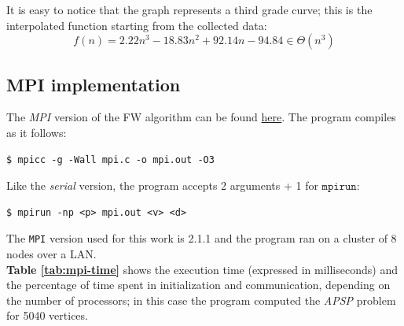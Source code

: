 It is easy to notice that the graph represents a 
third grade curve; this is the interpolated function starting from the collected data:
\[f(n) = 2.22n^3 - 18.83n^2 + 92.14n -94.84 \in \Theta(n^3) \]



\subsection{MPI implementation}\label{mpiimpl}

The \emph{MPI} version of the FW algorithm can be found \href{https://github.com/firaja/Parallel-FloydWarshall/blob/master/mpi.c}{here}. 
The program compiles as it follows:

\begin{lstlisting}[basicstyle=\footnotesize\ttfamily]
$ mpicc -g -Wall mpi.c -o mpi.out -O3
\end{lstlisting}
Like the \emph{serial} version, the program accepts 2 arguments + 1 for $\texttt{mpirun}$:
\begin{lstlisting}[basicstyle=\footnotesize\ttfamily]
$ mpirun -np <p> mpi.out <v> <d>
\end{lstlisting}
The \texttt{MPI} version used for this work is 2.1.1 and the program ran on a cluster of 8 nodes over a LAN. \\
\textbf{Table \ref*{tab:mpi-time}} shows the execution time (expressed in milliseconds) and the percentage of time spent in initialization and communication, depending on the number of processors; 
in this case the program computed the \emph{APSP} problem for 5040 vertices.

